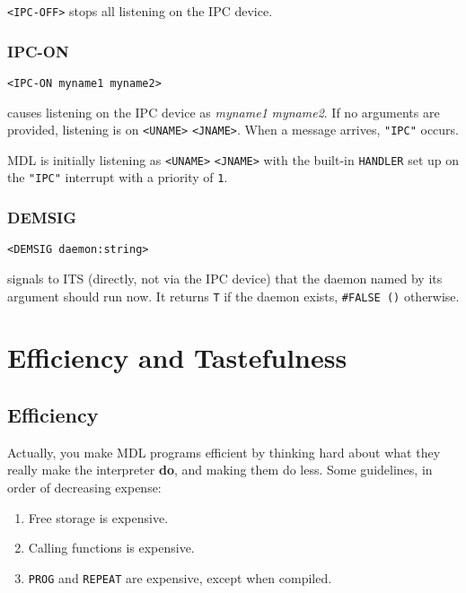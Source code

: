 \documentclass[a4paper]{scrbook}
\providecommand{\tightlist}{%
  \setlength{\itemsep}{0pt}\setlength{\parskip}{0pt}}
\begin{document}
\texttt{\textless{}IPC-OFF\textgreater{}} stops all listening on the IPC device.

\subsection{IPC-ON}\label{ipc-on}

\begin{verbatim}
<IPC-ON myname1 myname2>
\end{verbatim}

 causes listening on the IPC device as \emph{myname1} \emph{myname2}. If no arguments are
provided, listening is on \texttt{\textless{}UNAME\textgreater{}} \texttt{\textless{}JNAME\textgreater{}}. When a message
arrives, \texttt{"IPC"} occurs.

MDL is initially listening as \texttt{\textless{}UNAME\textgreater{}} \texttt{\textless{}JNAME\textgreater{}} with the
built-in \texttt{HANDLER} set up on the \texttt{"IPC"} interrupt with a priority of \texttt{1}.

\subsection{DEMSIG}\label{demsig}

\begin{verbatim}
<DEMSIG daemon:string>
\end{verbatim}

 signals to ITS (directly, not via the IPC device) that the daemon named by its argument
should run now. It returns \texttt{T} if the daemon exists, \texttt{\#FALSE\ ()} otherwise.

\chapter{Efficiency and Tastefulness}\label{chapter-24.-efficiency-and-tastefulness}

\section{Efficiency}\label{efficiency}

Actually, you make MDL programs efficient by thinking hard about what they really make the interpreter \textbf{do}, and
making them do less. Some guidelines, in order of decreasing expense:

\begin{enumerate}
\def\labelenumi{\arabic{enumi}.}
\tightlist
\item
  Free storage is expensive.
\item
  Calling functions is expensive.
\item
  \texttt{PROG} and \texttt{REPEAT} are expensive, except when compiled.
\end{enumerate}
\end{document}
